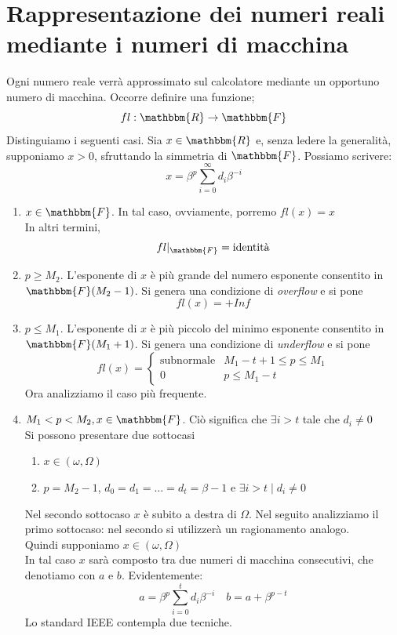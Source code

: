 \documentclass[12pt]{report}
\begin{document}
\section{Rappresentazione dei numeri reali mediante i numeri di macchina}
Ogni numero reale verrà approssimato sul calcolatore mediante un opportuno numero di macchina. Occorre definire una funzione;
\[
fl: \mathbbm{R} \to \mathbbm{F}
\]
Distinguiamo i seguenti casi. Sia $x \in \mathbbm{R}$ e, senza ledere la generalità, supponiamo $x > 0$, sfruttando la simmetria di $\mathbbm{F}$. Possiamo scrivere:
\[
x = \beta^p\sum_{i=0}^{\infty}d_i\beta^{-i}
\]
\begin{enumerate}
	\item $x\in\mathbbm{F}$. In tal caso, ovviamente, porremo $fl(x) = x$ \\
	In altri termini,
	\[
	fl|_\mathbbm{F} = \text{identità}
	\]
	\item $p \geq M_2$. L'esponente di $x$ è più grande del numero esponente consentito in $\mathbbm{F}(M_2 - 1)$. Si genera una condizione di \textit{overflow} e si pone
	\[
	fl(x) = +Inf
	\]
	\item $p \leq M_1$. L'esponente di $x$ è più piccolo del minimo esponente consentito in $\mathbbm{F}(M_1 + 1)$. Si genera una condizione di \textit{underflow} e si pone
	\[
	fl(x) = \begin{cases}
		\text{subnormale} & M_1 - t + 1 \leq p \leq M_1 \\
		0 & p \leq M_1 - t
	\end{cases}
	\]
	Ora analizziamo il caso più frequente.
	\item $M_1 < p < M_2, x\in\mathbbm{F}$. Ciò significa che $\exists i > t$ tale che $d_i \neq 0$ \\
	Si possono presentare due sottocasi
	\begin{enumerate}
		\item $x\in(\omega, \Omega)$
		\item $p = M_2 - 1$, $d_0 = d_1 = \dots = d_t = \beta - 1$ e $\exists i > t \mid d_i \neq 0$
	\end{enumerate}
	Nel secondo sottocaso $x$ è subito a destra di $\Omega$. Nel seguito analizziamo il primo sottocaso: nel secondo si utilizzerà un ragionamento analogo. \\
	Quindi supponiamo $x\in(\omega, \Omega)$ \\
	In tal caso $x$ sarà composto tra  due numeri di macchina consecutivi, che denotiamo con $a$ e $b$. Evidentemente:
	\[
	a = \beta^p\sum_{i=0}^{t}d_i\beta^{-i} \quad b = a + \beta^{p - t}
	\]
	Lo standard IEEE contempla due tecniche.

\end{enumerate}
\end{document}
